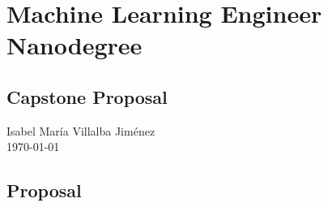 \documentclass[]{article}
\author{}
\date{}
\begin{document}
\section{Machine Learning Engineer
Nanodegree}\label{machine-learning-engineer-nanodegree}

\subsection{Capstone Proposal}\label{capstone-proposal}

Isabel María Villalba Jiménez \\ \today

\subsection{Proposal}\label{proposal}

\end{document}
